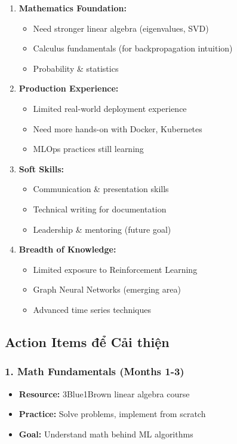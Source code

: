 \documentclass[12pt,a4paper]{article}
\begin{document}
\begin{enumerate}
    \item \textbf{Mathematics Foundation:} 
    \begin{itemize}
        \item Need stronger linear algebra (eigenvalues, SVD)
        \item Calculus fundamentals (for backpropagation intuition)
        \item Probability \& statistics
    \end{itemize}
    
    \item \textbf{Production Experience:}
    \begin{itemize}
        \item Limited real-world deployment experience
        \item Need more hands-on with Docker, Kubernetes
        \item MLOps practices still learning
    \end{itemize}
    
    \item \textbf{Soft Skills:}
    \begin{itemize}
        \item Communication \& presentation skills
        \item Technical writing for documentation
        \item Leadership \& mentoring (future goal)
    \end{itemize}
    
    \item \textbf{Breadth of Knowledge:}
    \begin{itemize}
        \item Limited exposure to Reinforcement Learning
        \item Graph Neural Networks (emerging area)
        \item Advanced time series techniques
    \end{itemize}
\end{enumerate}

\subsection{Action Items để Cải thiện}

\subsubsection{1. Math Fundamentals (Months 1-3)}
\begin{itemize}
    \item \textbf{Resource:} 3Blue1Brown linear algebra course
    \item \textbf{Practice:} Solve problems, implement from scratch
    \item \textbf{Goal:} Understand math behind ML algorithms
\end{itemize}
\end{document}
